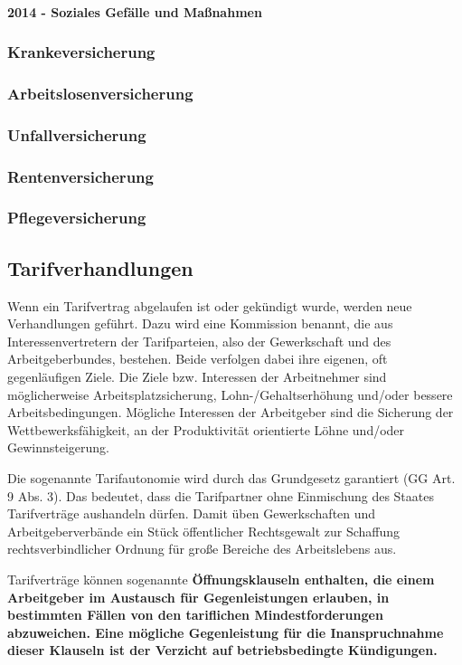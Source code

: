 \paragraph{2014 - Soziales Gefälle und Maßnahmen}

\subsubsection{Krankeversicherung}
\subsubsection{Arbeitslosenversicherung}
\subsubsection{Unfallversicherung}
\subsubsection{Rentenversicherung}
\subsubsection{Pflegeversicherung}

\subsection{Tarifverhandlungen}

Wenn ein Tarifvertrag abgelaufen ist oder gekündigt wurde, werden neue Verhandlungen geführt. Dazu wird eine Kommission benannt, die aus Interessenvertretern der Tarifparteien, also der Gewerkschaft und des Arbeitgeberbundes, bestehen. Beide verfolgen dabei ihre eigenen, oft gegenläufigen Ziele. Die Ziele bzw. Interessen der Arbeitnehmer sind möglicherweise Arbeitsplatzsicherung, Lohn-/Gehaltserhöhung und/oder bessere Arbeitsbedingungen. Mögliche Interessen der Arbeitgeber sind die Sicherung der Wettbewerksfähigkeit, an der Produktivität orientierte Löhne und/oder Gewinnsteigerung. 

Die sogenannte Tarifautonomie wird durch das Grundgesetz garantiert (GG Art. 9 Abs. 3). Das bedeutet, dass die Tarifpartner ohne Einmischung des Staates Tarifverträge aushandeln dürfen. Damit üben Gewerkschaften und Arbeitgeberverbände ein Stück öffentlicher Rechtsgewalt zur Schaffung rechtsverbindlicher Ordnung für große Bereiche des Arbeitslebens aus.

Tarifverträge können sogenannte \bf{Öffnungsklauseln} enthalten, die einem Arbeitgeber im Austausch für Gegenleistungen erlauben, in bestimmten Fällen von den tariflichen Mindestforderungen abzuweichen. Eine mögliche Gegenleistung für die Inanspruchnahme dieser Klauseln ist der Verzicht auf betriebsbedingte Kündigungen.

